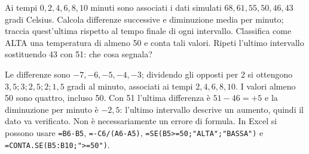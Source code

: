 
\begin{esercizio}
Ai tempi $0,2,4,6,8,10$ minuti sono associati i dati simulati $68,61,55,50,46,43$ gradi Celsius.
Calcola differenze successive e diminuzione media per minuto; traccia quest'ultima rispetto al tempo finale di ogni intervallo.
Classifica come ALTA una temperatura di almeno 50 e conta tali valori.
Ripeti l'ultimo intervallo sostituendo 43 con 51: che cosa segnala?
\end{esercizio}

\begin{soluzione}
Le differenze sono $-7,-6,-5,-4,-3$; dividendo gli opposti per 2 si ottengono
$3{,}5;3;2{,}5;2;1{,}5$ gradi al minuto, associati ai tempi $2,4,6,8,10$.
I valori almeno 50 sono quattro, incluso 50.
Con 51 l'ultima differenza è $51-46=+5$ e la diminuzione per minuto è $-2{,}5$:
l'ultimo intervallo descrive un aumento, quindi il dato va verificato.
Non è necessariamente un errore di formula. In Excel si possono usare
\texttt{=B6-B5}, \texttt{=-C6/(A6-A5)}, \texttt{=SE(B5>=50;"ALTA";"BASSA")}
e \texttt{=CONTA.SE(B5:B10;">=50")}.
\end{soluzione}
